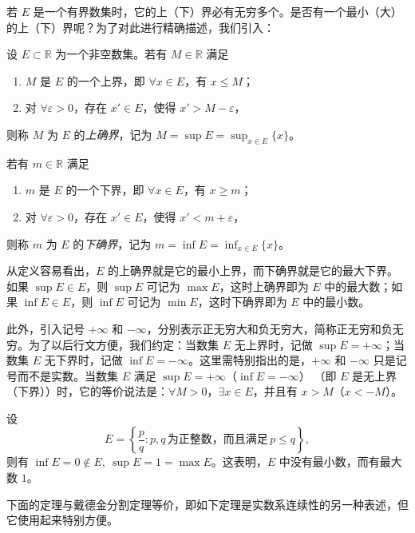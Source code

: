 \documentclass[UTF8,12pt,a4paper,fontset=fandol]{ctexbook}
\begin{document}
若 $E$ 是一个有界数集时，它的上（下）界必有无穷多个。是否有一个最小（大）的上（下）界呢？为了对此进行精确描述，我们引入：


\begin{definition}
设 $E\subset\mathbb{R}$ 为一个非空数集。若有 $M\in\mathbb{R}$ 满足
\begin{enumerate}[label=(\arabic*)]
  \item $M$ 是 $E$ 的一个上界，即 $\forall x\in E$，有 $x\leqslant M$；
  \item 对 $\forall\varepsilon>0$，存在 $x'\in E$，使得 $x'>M-\varepsilon$，
\end{enumerate}
则称 $M$ 为 $E$ 的\emph{上确界}，记为 $M=\sup E=\sup_{x\in E}\{x\}$。


若有 $m\in\mathbb{R}$ 满足
\begin{enumerate}[label=(\arabic*)]
  \item $m$ 是 $E$ 的一个下界，即 $\forall x\in E$，有 $x\geqslant m$；
  \item 对 $\forall\varepsilon>0$，存在 $x'\in E$，使得 $x'<m+\varepsilon$，
\end{enumerate}
则称 $m$ 为 $E$ 的\emph{下确界}，记为 $m=\inf E=\inf_{x\in E}\{x\}$。
\end{definition}


从定义容易看出，$E$ 的上确界就是它的最小上界，而下确界就是它的最大下界。如果 $\sup E\in E$，则 $\sup E$ 可记为 $\max E$，这时上确界即为 $E$ 中的最大数；如果 $\inf E\in E$，则 $\inf E$ 可记为 $\min E$，这时下确界即为 $E$ 中的最小数。


此外，引入记号 $+\infty$ 和 $-\infty$，分别表示正无穷大和负无穷大，简称正无穷和负无穷。为了以后行文方便，我们约定：当数集 $E$ 无上界时，记做 $\sup E=+\infty$；当数集 $E$ 无下界时，记做 $\inf E=-\infty$。这里需特别指出的是，$+\infty$ 和 $-\infty$ 只是记号而不是实数。当数集 $E$ 满足 $\sup E=+\infty$（$\inf E=-\infty$） （即 $E$ 是无上界（下界））时，它的等价说法是：$\forall M>0$，$\exists x\in E$，并且有 $x>M$（$x<-M$）。


\begin{example}
设
\[
  E=\left\{\frac pq:p,q\,\text{为正整数，而且满足}\,p\leqslant q\right\},
\]
则有 $\inf E=0\notin E,\ \sup E=1=\max E$。这表明，$E$ 中没有最小数，而有最大数 $1$。
\end{example}


下面的定理与戴德金分割定理等价，即如下定理是实数系连续性的另一种表述，但它使用起来特别方便。
\end{document}
